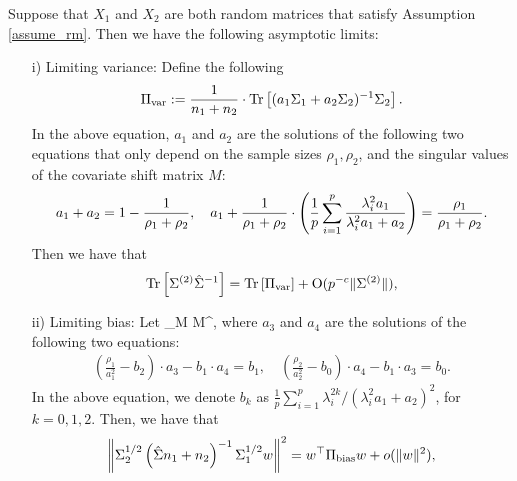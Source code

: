 \begin{theorem}
	Suppose that $X_1$ and $X_2$ are both random matrices that satisfy Assumption \ref{assume_rm}.
	Then we have the following asymptotic limits:
	\begin{enumerate}
		\item[i)] Limiting variance:
		 	Define the following
			\[ \Pi_{\text{var}} := \frac{1}{n_1 + n_2}\cdot \operatorname{Tr}\left[ (a_1 \Sigma_1 + a_2\Sigma_2)^{-1} \Sigma_2\right]. \]
			In the above equation, $a_1$ and $a_2$ are the solutions of the following two equations that only depend on the sample sizes $\rho_1, \rho_2$, and the singular values of the covariate shift matrix $M$:
			\begin{align}
				a_1 + a_2 = 1- \frac{1}{\rho_1 + \rho_2},\quad a_1 + \frac1{\rho_1 + \rho_2}\cdot \left({\frac{1}{p}\sum_{i=1}^p \frac{\lambda_i^2 a_1}{\lambda_i^2 a_1 + a_2}}\right) = \frac{\rho_1}{\rho_1 + \rho_2}. \label{eq_a12extra}
			\end{align}
			Then we have that
			\begin{align}\label{lem_cov_shift_eq}
				\bigtr{\Sigma^{(2)} \hat{\Sigma}^{-1}} = \bigtr{\Pi_{\vari}} + \OO(p^{-c}\norm{\Sigma^{(2)}}), %
			\end{align}
		\item[ii)] Limiting bias: Let
			\be\label{def Pibias} \Pi_\bias {}  M  M^{\top}, \ee
				where $a_{3}$ and $a_4$ are the solutions of the following two equations:
			\begin{gather}\label{eq_a34extra}
				\left(\frac{\rho_1}{a_1^{2}} -  b_2  \right)\cdot  a_3 -  b_1 \cdot  a_4 = b_1,\quad \left(\frac{\rho_2}{a_2^{2}}-  b_0\right)\cdot  a_4 - b_1 \cdot  a_3
				= b_0 .
			\end{gather}
				In the above equation, we denote $b_k$ as $\frac1{p}\sum_{i=1}^p {\lambda_i^{2k}} / { (\lambda_i^2 a_1 + a_2)^2  }$, for $k = 0, 1, 2$.
			Then, we have that
			\begin{align}\label{lem_cov_derv_eq}
				\left\| \Sigma_2^{1/2} \left({\hat{\Sigma}{n_1 + n_2}}\right)^{-1} \Sigma_1^{1/2} w \right\|^2
						= w^{\top} \Pi_{\text{bias}} w + o(\|w\|^2),
			\end{align}
	\end{enumerate}
\end{theorem}

